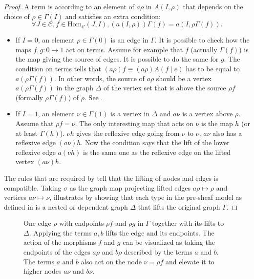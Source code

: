 \documentclass[12pt,a4paper,twoside,xetex]{book} %
\newcommand{\homo}[3]{\text{Hom}_{#1}\left(#2,#3\right)}
\begin{document}
\begin{proof}
A term is according to  an element of $a\rho$ in $A(I,\rho)$ that 
depends on the choice of $\rho \in \Gamma (I)$ and satisfies an extra 
condition: $$\forall J \in \mathcal{C}, f \in \homo{\mathcal{C}}{J}{I}, 
(a(I,\rho))\Gamma(f)= a(I,\rho \Gamma (f)).$$ 
\begin{itemize}

\item If $I=0$, an element $\rho \in \Gamma (0)$ is an edge in $\Gamma$. It is 
possible to check how the maps $f,g:0\rightarrow 1$ act on terms. Assume for 
example that $f$ (actually $\Gamma(f)$)  is the map giving the source of edges. 
It is possible to do the same for $g$. The condition on terms tells that 
$(a\rho)f \equiv (a \rho)A(f \mid e)$ has to be equal to $a(\rho \Gamma (f))$. 
In other words, the source of $a\rho$ should be a vertex $a(\rho \Gamma (f))$ 
in the graph $\Delta$ of the vertex set that is above the source $\rho f$ 
(formally $\rho \Gamma (f)$) of $\rho$. See .


\item If $I = 1$, an  element $\nu \in \Gamma (1)$ is a vertex in $\Delta$ 
and $a\nu$ is a vertex above $\rho$. Assume that $\rho f = \nu$. The only 
interesting map that acts on $\nu$ is the map $h$ (or at least $\Gamma (h)$). 
$\nu h$ gives the reflexive edge going from $\nu$ to $\nu$. $a\nu$ also has a 
reflexive edge $(a\nu)h$. Now the condition says that the lift of the lower 
reflexive edge $a (\nu h)$ is the same one as the reflexive edge on the lifted 
vertex $(a \nu) h$. 
\end{itemize}

The rules that are required by  tell that the lifting 
of nodes and edges is compatible. Taking $\sigma$ as the graph map projecting lifted edges $a\rho \mapsto \rho$ and vertices $a\nu \mapsto \nu$,  illustrates   by showing that each type in the pre-sheaf model as defined in 
 is a nested or dependent graph $\Delta$ that lifts 
the original graph $\Gamma$.
\end{proof}


\begin{figure}\label{depgraphdiag}
\begin{center} 

\end{center}
\caption{One edge $\rho$ with endpoints $\rho f$ and $\rho g$ in $\Gamma$ together with its lifts to $\Delta$. Applying the terms $a,b$ lifts the edge and its endpoints. The action of the morphisms $f$ and $g$ can be visualized as taking the endpoints of the edges $a\rho$
and $b\rho$ described by the terms $a$ and $b$. The terms $a$ and $b$ also act 
on the node $\nu = \rho f$ and elevate it to higher nodes $a\nu$ and $b\nu$. 
}
\end{figure}
\end{document}
